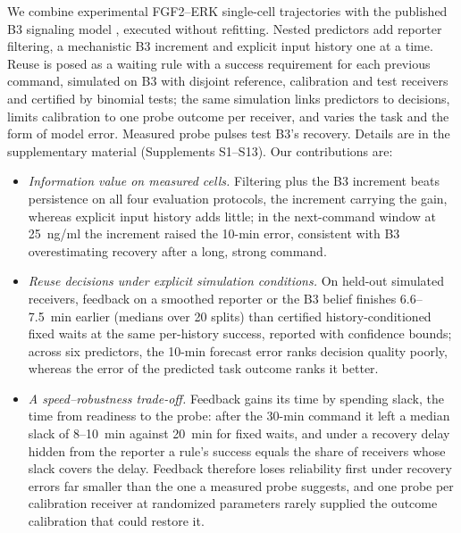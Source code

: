 \documentclass[conference]{IEEEtran}
\begin{document}
We combine experimental FGF2--ERK single-cell trajectories with the published B3 signaling model \cite{blum2019}, executed without refitting. Nested predictors add reporter filtering, a mechanistic B3 increment and explicit input history one at a time. Reuse is posed as a waiting rule with a success requirement for each previous command, simulated on B3 with disjoint reference, calibration and test receivers and certified by binomial tests; the same simulation links predictors to decisions, limits calibration to one probe outcome per receiver, and varies the task and the form of model error. Measured probe pulses test B3's recovery. Details are in the supplementary material (Supplements S1--S13). Our contributions are:
\begin{itemize}
\item \emph{Information value on measured cells.} Filtering plus the B3 increment beats persistence on all four evaluation protocols, the increment carrying the gain, whereas explicit input history adds little; in the next-command window at 25~ng/ml the increment raised the 10-min error, consistent with B3 overestimating recovery after a long, strong command.
\item \emph{Reuse decisions under explicit simulation conditions.} On held-out simulated receivers, feedback on a smoothed reporter or the B3 belief finishes 6.6--7.5~min earlier (medians over 20 splits) than certified history-conditioned fixed waits at the same per-history success, reported with confidence bounds; across six predictors, the 10-min forecast error ranks decision quality poorly, whereas the error of the predicted task outcome ranks it better.
\item \emph{A speed--robustness trade-off.} Feedback gains its time by spending slack, the time from readiness to the probe: after the 30-min command it left a median slack of 8--10~min against 20~min for fixed waits, and under a recovery delay hidden from the reporter a rule's success equals the share of receivers whose slack covers the delay. Feedback therefore loses reliability first under recovery errors far smaller than the one a measured probe suggests, and one probe per calibration receiver at randomized parameters rarely supplied the outcome calibration that could restore it.
\end{itemize}
\end{document}
